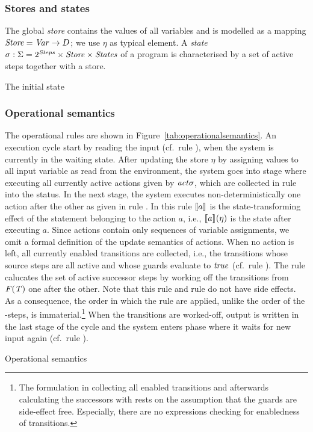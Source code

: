 \subsubsection{Stores and states}





The global \emph{store} contains the values of all variables and is
modelled as a mapping $\mathit{Store} = \mathit{Var} \to D$; we use $\eta$ as typical
element. A \emph{state} $\sigma \mathrel{:} \Sigma = 2^{\mathit{Steps}} \times \mathit{Store} \times
\mathit{States}$ of a program is characterised by a set of active steps together
with a store.

The initial state



\subsubsection{Operational semantics}


The operational rules are shown in Figure~\ref{tab:operationalsemantics}.
An execution cycle start by reading the input (cf.\ rule ), when
the system is currently in the waiting state. After updating the store
$\eta$ by assigning values to all input variable as read from the
environment, the system goes into stage where executing all currently
active actions given by $\mathit{act}{\sigma}$, which are collected in rule
 into the status. In the next stage, the system executes
non-deterministically one action after the other as given in rule .
In this rule $[\![a]\!]_{}$ is the state-transforming effect of the statement
belonging to the action $a$, i.e., $[\![a]\!]_{}(\eta)$ is the state after
executing $a$. Since actions contain only sequences of variable
assignments, we omit a formal definition of the update semantics of
actions. When no action is left, all currently enabled transitions are
collected, i.e., the transitions whose source steps are all active and
whose guards evaluate to $\mathit{true}$ (cf.\ rule ). The rule
 calucates the set of active successor steps by working off
the transitions from $\mathit{F(T)}$ one after the other. Note that this
rule and rule  do not have side effects. As a consequence, the
order in which the  rule are applied, unlike the order of
the -steps, is immaterial.\footnote{The formulation in 
  collecting all enabled transitions and afterwards calculating the
  successors with  rests on the assumption that the guards
  are side-effect free.  Especially, there are no expressions checking for
  enabledness of transitions.} When the transitions are worked-off, output
is written in the last stage of the cycle and the system enters phase where
it waits for new input again (cf.\ rule ).


\begin{table}[htbp]
  \begin{ruleset}
      
  \end{ruleset}
  \caption{Operational semantics}
  \label{tab:operationalsemantics}
\end{table}







